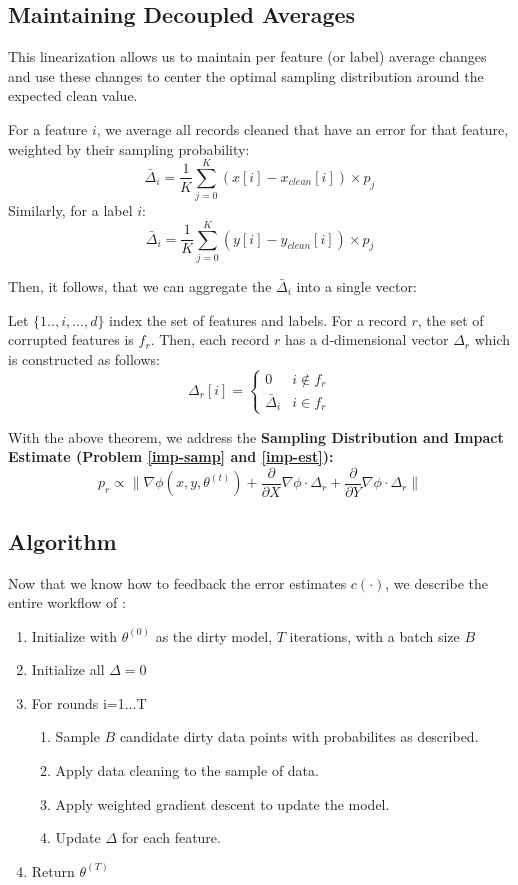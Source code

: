 \subsection{Maintaining Decoupled Averages}
This linearization allows us to maintain per feature (or label) average changes and use these changes to center the optimal sampling distribution around the expected clean value.
\begin{lemma}
For a feature $i$, we average all records cleaned that have an error for that feature, weighted by their sampling probability:
\[
\bar{\Delta}_i = \frac{1}{K}\sum_{j=0}^K (x[i]-x_{clean}[i])\times p_j
\]
Similarly, for a label $i$:
\[
\bar{\Delta}_i = \frac{1}{K}\sum_{j=0}^K (y[i]-y_{clean}[i])\times p_j
\]
\end{lemma}

Then, it follows, that we can aggregate the $\bar{\Delta}_i$ into a single vector:
\begin{theorem}
Let $\{1..,i,...,d\}$ index the set of features and labels.
For a record $r$, the set of corrupted features is $f_r$.
Then, each record $r$ has a d-dimensional vector $\Delta_r$ which is constructed as follows:
\[
 \Delta_r[i] = \begin{cases} 0 & i \notin f_r \\ 
\bar{\Delta}_i & i \in f_r
\end{cases} 
\]
\end{theorem}

With the above theorem, we address the \textbf{Sampling Distribution and Impact Estimate (Problem \ref{imp-samp} and \ref{imp-est}): }
\[p_{r}\propto\|\nabla\phi(x,y,\theta^{(t)}) + \frac{\partial}{\partial X}\nabla\phi \cdot \Delta_r +  \frac{\partial}{\partial Y}\nabla\phi \cdot \Delta_r\|\]

\subsection{Algorithm}
Now that we know how to feedback the error estimates $c(\cdot)$, we describe the entire workflow of \sys:
\begin{enumerate}[noitemsep]
\item Initialize with $\theta^{(0)}$ as the dirty model, $T$ iterations, with a batch size $B$
\item Initialize all $\Delta = 0$
\item For rounds i=1...T
\begin{enumerate}
	\item Sample $B$ candidate dirty data points with probabilites as described.
	\item Apply data cleaning to the sample of data.
	\item Apply weighted gradient descent to update the model.
	\item Update $\Delta$ for each feature.
\end{enumerate}
\item Return $\theta^{(T)}$
\end{enumerate}

